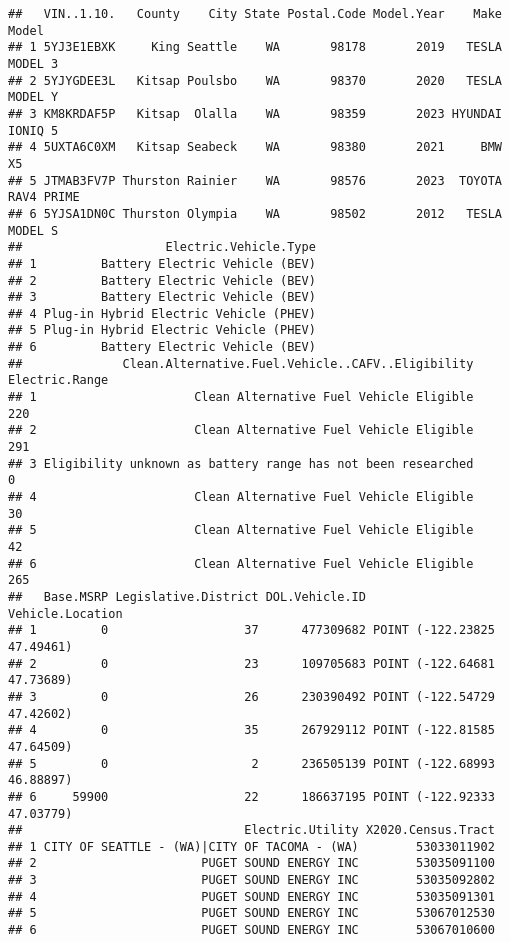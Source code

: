 \documentclass[
]{article}
\begin{document}
\begin{verbatim}
##   VIN..1.10.   County    City State Postal.Code Model.Year    Make      Model
## 1 5YJ3E1EBXK     King Seattle    WA       98178       2019   TESLA    MODEL 3
## 2 5YJYGDEE3L   Kitsap Poulsbo    WA       98370       2020   TESLA    MODEL Y
## 3 KM8KRDAF5P   Kitsap  Olalla    WA       98359       2023 HYUNDAI    IONIQ 5
## 4 5UXTA6C0XM   Kitsap Seabeck    WA       98380       2021     BMW         X5
## 5 JTMAB3FV7P Thurston Rainier    WA       98576       2023  TOYOTA RAV4 PRIME
## 6 5YJSA1DN0C Thurston Olympia    WA       98502       2012   TESLA    MODEL S
##                    Electric.Vehicle.Type
## 1         Battery Electric Vehicle (BEV)
## 2         Battery Electric Vehicle (BEV)
## 3         Battery Electric Vehicle (BEV)
## 4 Plug-in Hybrid Electric Vehicle (PHEV)
## 5 Plug-in Hybrid Electric Vehicle (PHEV)
## 6         Battery Electric Vehicle (BEV)
##              Clean.Alternative.Fuel.Vehicle..CAFV..Eligibility Electric.Range
## 1                      Clean Alternative Fuel Vehicle Eligible            220
## 2                      Clean Alternative Fuel Vehicle Eligible            291
## 3 Eligibility unknown as battery range has not been researched              0
## 4                      Clean Alternative Fuel Vehicle Eligible             30
## 5                      Clean Alternative Fuel Vehicle Eligible             42
## 6                      Clean Alternative Fuel Vehicle Eligible            265
##   Base.MSRP Legislative.District DOL.Vehicle.ID            Vehicle.Location
## 1         0                   37      477309682 POINT (-122.23825 47.49461)
## 2         0                   23      109705683 POINT (-122.64681 47.73689)
## 3         0                   26      230390492 POINT (-122.54729 47.42602)
## 4         0                   35      267929112 POINT (-122.81585 47.64509)
## 5         0                    2      236505139 POINT (-122.68993 46.88897)
## 6     59900                   22      186637195 POINT (-122.92333 47.03779)
##                               Electric.Utility X2020.Census.Tract
## 1 CITY OF SEATTLE - (WA)|CITY OF TACOMA - (WA)        53033011902
## 2                       PUGET SOUND ENERGY INC        53035091100
## 3                       PUGET SOUND ENERGY INC        53035092802
## 4                       PUGET SOUND ENERGY INC        53035091301
## 5                       PUGET SOUND ENERGY INC        53067012530
## 6                       PUGET SOUND ENERGY INC        53067010600
\end{verbatim}
\end{document}
